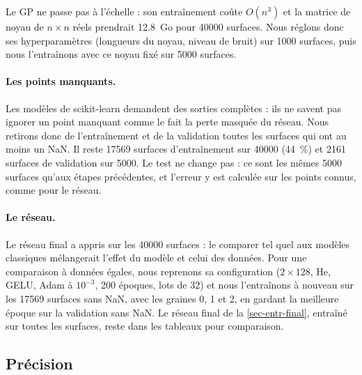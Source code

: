 Le GP ne passe pas à l'échelle : son entraînement coûte $O(n^3)$ et la matrice de noyau de $n \times n$ réels
prendrait \num{12.8}~Go pour \num{40000} surfaces. Nous réglons donc ses hyperparamètres (longueurs du noyau,
niveau de bruit) sur \num{1000} surfaces, puis nous l'entraînons avec ce noyau fixé sur \num{5000} surfaces.

\paragraph{Les points manquants.} Les modèles de scikit-learn demandent des sorties complètes : ils ne savent pas
ignorer un point manquant comme le fait la perte masquée du réseau. Nous retirons donc de l'entraînement et de la
validation toutes les surfaces qui ont au moins un NaN. Il reste \num{17569} surfaces d'entraînement sur
\num{40000} (\SI{44}{\percent}) et \num{2161} surfaces de validation sur \num{5000}. Le test ne change pas : ce sont
les mêmes \num{5000} surfaces qu'aux étapes précédentes, et l'erreur y est calculée sur les points connus, comme
pour le réseau.

\paragraph{Le réseau.} Le réseau final a appris sur les \num{40000} surfaces : le comparer tel quel aux modèles
classiques mélangerait l'effet du modèle et celui des données. Pour une comparaison à données égales, nous reprenons sa configuration ($2\times128$, He,
GELU, Adam à $10^{-3}$, 200 époques, lots de 32) et nous l'entraînons à nouveau sur les \num{17569} surfaces sans
NaN, avec les graines 0, 1 et 2, en gardant la meilleure époque sur la validation sans NaN. Le réseau final de la
\cref{sec-entr-final}, entraîné sur toutes les surfaces, reste dans les tableaux pour comparaison.

\subsection{Précision}
\label{sec-ml-precision}

